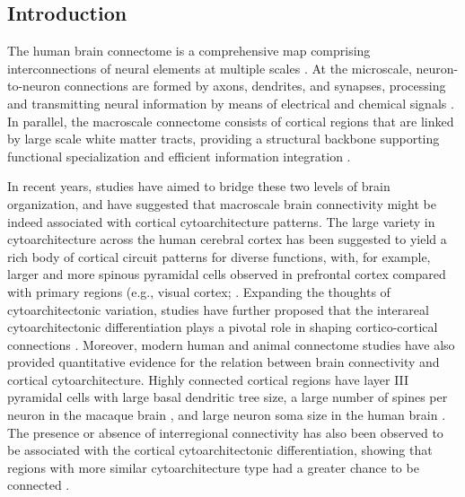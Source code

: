 \begin{refsection}
\section*{Introduction}
The human brain connectome is a comprehensive map comprising interconnections of neural elements at multiple scales \citep{sporns_human_2005,sporns_human_2011}. At the microscale, neuron-to-neuron connections are formed by axons, dendrites, and synapses, processing and transmitting neural information by means of electrical and chemical signals \citep{cossell_functional_2015,yuste_dendritic_2011,ullo_functional_2014}. In parallel, the macroscale connectome consists of cortical regions that are linked by large scale white matter tracts, providing a structural backbone supporting functional specialization and efficient information integration \citep{bullmore_economy_2012,van_den_heuvel_network_2013}.

In recent years, studies have aimed to bridge these two levels of brain organization, and have suggested that macroscale brain connectivity might be indeed associated with cortical cytoarchitecture patterns. The large variety in cytoarchitecture across the human cerebral cortex \citep{brodmann1909vergleichende,von1925cytoarchitektonik} has been suggested to yield a rich body of cortical circuit patterns for diverse functions, with, for example, larger and more spinous pyramidal cells observed in prefrontal cortex compared with primary regions (e.g., visual cortex; \citep{elston2003cortex,elston2001pyramidal}. Expanding the thoughts of cytoarchitectonic variation, studies have further proposed that the interareal cytoarchitectonic differentiation plays a pivotal role in shaping cortico-cortical connections \citep{barbas2015general}. Moreover, modern human and animal connectome studies have also provided quantitative evidence for the relation between brain connectivity and cortical cytoarchitecture. Highly connected cortical regions have layer III pyramidal cells with large basal dendritic tree size, a large number of spines per neuron in the macaque brain \citep{scholtens2014linking}, and large neuron soma size in the human brain \citep{van2015bridging}. The presence or absence of interregional connectivity has also been observed to be associated with the cortical cytoarchitectonic differentiation, showing that regions with more similar cytoarchitecture type had a greater chance to be connected \citep{beul2017predictive,beul2015predictive,goulas2016cytoarchitectonic,goulas2017principles,hilgetag2016primate}.


\end{refsection}
